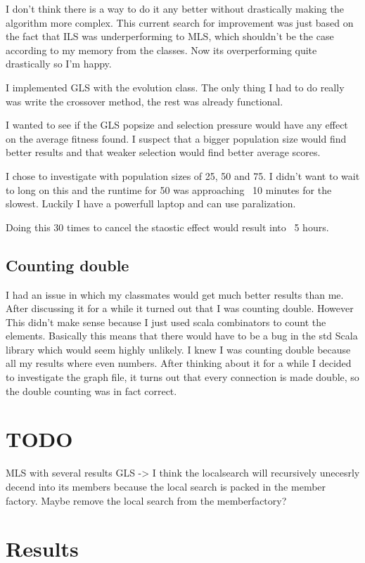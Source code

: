 \documentclass{article}
\begin{document}
\begin{empfile}
I don't think there is a way to do it any better without drastically making
the algorithm more complex.
This current search for improvement was just based on the fact that ILS was
underperforming to MLS, which shouldn't be the case according to my memory
from the classes. Now its overperforming quite drastically so I'm happy.

I implemented GLS with the evolution class. The only thing I had to do really
was write the crossover method, the rest was already functional.

I wanted to see if the GLS popsize and selection pressure would have any
effect on the average fitness found. I suspect that a bigger population size
would find better results and that weaker selection would find better
average scores.

I chose to investigate with population sizes of 25, 50 and 75. I didn't want
to wait to long on this and the runtime for 50 was approaching ~10 minutes
for the slowest. Luckily I have a powerfull laptop and can use paralization.

Doing this 30 times to cancel the staostic effect would result into ~5 hours.

\subsection{Counting double}
I had an issue in which my classmates would get much better results than me.
After discussing it for a while it turned out that I was counting double. However
This didn't make sense because I just used scala combinators to count the 
elements. Basically this means that there would have to be a bug in the std
Scala library which would seem highly unlikely. I knew I was counting double
because all my results where even numbers. After thinking about it for a while
I decided to investigate the graph file, it turns out that every connection
is made double, so the double counting was in fact correct.


\section{TODO}
MLS with several results
GLS -> I think the localsearch will recursively unecesrly decend into its members
because the local search is packed in the member factory. Maybe remove the
local search from the memberfactory?


\section{Results}

\end{empfile}
\end{document}
